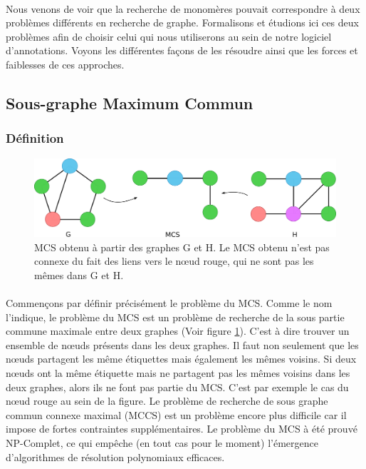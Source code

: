\documentclass[12pt,french,twoside]{report}
\begin{document}
\paragraph{}Nous venons de voir que la recherche de monomères pouvait correspondre à deux problèmes différents en recherche de graphe.
Formalisons et étudions ici ces deux problèmes afin de choisir celui qui nous utiliserons au sein de notre logiciel d'annotations.
Voyons les différentes façons de les résoudre ainsi que les forces et faiblesses de ces approches.


\subsection{Sous-graphe Maximum Commun}

\subsubsection{Définition}

\begin{figure}[!ht]
  \begin{center}
    \includegraphics[width=450px]{Figures/s2m/MCS-SI/mcs.png}
    \caption{\label{mcs_fig}MCS obtenu à partir des graphes G et H.
    Le MCS obtenu n'est pas connexe du fait des liens vers le n\oe{}ud rouge, qui ne sont pas les mêmes dans G et H.}
  \end{center}
\end{figure}

\paragraph{}Commençons par définir précisément le problème du MCS.
Comme le nom l'indique, le problème du MCS est un problème de recherche de la sous partie commune maximale entre deux graphes (Voir figure \ref{mcs_fig}).
C'est à dire trouver un ensemble de n\oe{}uds présents dans les deux graphes.
Il faut non seulement que les n\oe{}uds partagent les même étiquettes mais également les mêmes voisins.
Si deux n\oe{}uds ont la même étiquette mais ne partagent pas les mêmes voisins dans les deux graphes, alors ils ne font pas partie du MCS.
C'est par exemple le cas du n\oe{}ud rouge au sein de la figure.
Le problème de recherche de sous graphe commun connexe maximal (MCCS) est un problème encore plus difficile car il impose de fortes contraintes supplémentaires.
Le problème du MCS à été prouvé NP-Complet\cite{garey_computers_1979}, ce qui empêche (en tout cas pour le moment) l'émergence d'algorithmes de résolution polynomiaux efficaces.
\end{document}
